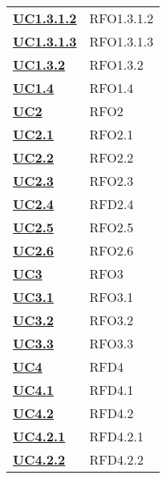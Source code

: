 \begin{longtable}[H]{| >{\centering\bfseries}p{8cm} | >{\centering\arraybackslash}p{8cm} |}
    \hyperref[spar:uc1.3.1.2]{UC1.3.1.2} & RFO1.3.1.2 \\

    \hyperref[spar:uc1.3.1.3]{UC1.3.1.3} & RFO1.3.1.3 \\

    \hyperref[par:uc1.3.2]{UC1.3.2} & RFO1.3.2 \\

    \hyperref[ssub:uc1.4]{UC1.4} & RFO1.4 \\



    \hyperref[sub:uc2]{UC2} &  RFO2\\

    \hyperref[ssub:uc2.1]{UC2.1} & RFO2.1 \\

    \hyperref[ssub:uc2.2]{UC2.2} & RFO2.2 \\

    \hyperref[ssub:uc2.3]{UC2.3} & RFO2.3 \\

    \hyperref[ssub:uc2.4]{UC2.4} & RFD2.4 \\

    \hyperref[ssub:uc2.5]{UC2.5} & RFO2.5 \\

    \hyperref[ssub:uc2.6]{UC2.6} & RFO2.6 \\



    \hyperref[sub:uc3]{UC3} & RFO3 \\

    \hyperref[ssub:uc3.1]{UC3.1} & RFO3.1 \\

    \hyperref[ssub:uc3.2]{UC3.2} & RFO3.2 \\

    \hyperref[ssub:uc3.3]{UC3.3} & RFO3.3 \\




    \hyperref[sub:uc4]{UC4} & RFD4 \\

    \hyperref[ssub:uc4.1]{UC4.1} & RFD4.1 \\

    \hyperref[ssub:uc4.2]{UC4.2} & RFD4.2 \\

    \hyperref[par:uc4.2.1]{UC4.2.1} & RFD4.2.1 \\

    \hyperref[par:uc4.2.2]{UC4.2.2} & RFD4.2.2 \\


\end{longtable}
